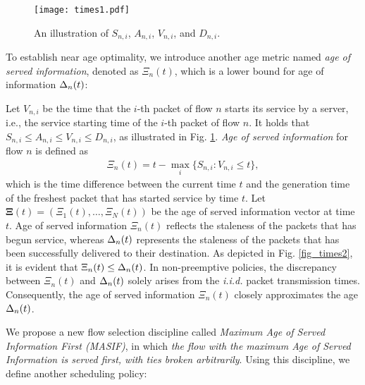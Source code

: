 
\begin{figure}
\centering 
\texttt{[image: times1.pdf]} \caption{An illustration of $S_{n,i}$, $A_{n,i}$, $V_{n,i}$, and $D_{n,i}$.}
\label{fig_times1} 
\vspace{-5mm}
\end{figure} 


To establish near age optimality, we introduce another age metric named \emph{age of served information}, denoted as $\Xi_{n} (t)$, which is a lower bound for age of information $\Delta_{n}(t)$: 

Let $V_{n,i}$ be the time that the $i$-th packet of flow $n$ starts its service by a server, i.e., the service starting time of the $i$-th packet of flow $n$. It holds that $S_{n,i}\leq A_{n,i}\leq V_{n,i}\leq D_{n,i}$, as illustrated in Fig. \ref{fig_times1}.
\emph{Age of served information} for flow $n$ is defined as
\begin{align}\label{eq_age_served}
\Xi_{n} (t) = t - \max_i\{S_{n,i}: V_{n,i} \leq t\},
\end{align}
which is the time difference between the current time $t$ and the generation time of the freshest packet that has started service by time $t$. Let $\bm{\Xi}(t)=(\Xi_{1} (t),\ldots,\Xi_{N} (t))$ be the age of served information vector at time $t$. Age of served information $\Xi_{n} (t)$ reflects the staleness of the packets that has begun service, whereas $\Delta_{n}(t)$ represents the staleness of the packets that has been successfully delivered to their destination. As depicted in Fig. \ref{fig_times2}, it is evident that $\Xi_{n} (t)\leq \Delta_{n}(t)$. In non-preemptive policies, the discrepancy between $\Xi_{n} (t)$ and $\Delta_{n}(t)$ solely arises from the \emph{i.i.d.} packet transmission times. 
Consequently, the age of served information $\Xi_{n} (t)$ closely approximates the age $\Delta_{n}(t)$.








We propose a new flow selection discipline called \emph{Maximum Age of Served Information First (MASIF)}, in which 
\emph{the flow with the maximum Age of Served Information is served first, with ties broken arbitrarily}. Using this discipline, we define another scheduling policy:


